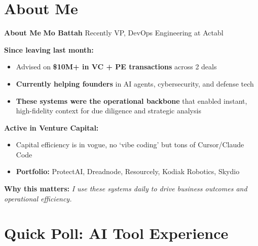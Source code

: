 \documentclass[
  ignorenonframetext,
  aspectratio=169,
]{beamer}
\providecommand{\tightlist}{%
  \setlength{\itemsep}{0pt}\setlength{\parskip}{0pt}}
\begin{document}
\begin{frame}
\end{frame}

\section{\texorpdfstring{\textbf{About Me}}{About Me}}\label{about-me}

\begin{frame}{\textbf{About Me}}
\textbf{Mo Battah} \textbar{} Recently VP, DevOps Engineering at Actabl

\textbf{Since leaving last month:}

\begin{itemize}
\tightlist
\item
  Advised on \textbf{\$10M+ in VC + PE transactions} across 2 deals
\item
  \textbf{Currently helping founders} in AI agents, cybersecurity, and
  defense tech
\item
  \textbf{These systems were the operational backbone} that enabled
  instant, high-fidelity context for due diligence and strategic
  analysis
\end{itemize}

\textbf{Active in Venture Capital:}

\begin{itemize}
\tightlist
\item
  Capital efficiency is in vogue, no `vibe coding' but tons of
  Cursor/Claude Code
\item
  \textbf{Portfolio:} ProtectAI, Dreadnode, Resourcely, Kodiak Robotics,
  Skydio
\end{itemize}

\textbf{Why this matters:} \emph{I use these systems daily to drive
business outcomes and operational efficiency.}
\end{frame}

\begin{frame}
\end{frame}

\section{\texorpdfstring{\textbf{Quick Poll: AI Tool
Experience}}{Quick Poll: AI Tool Experience}}\label{quick-poll-ai-tool-experience}
\end{document}
